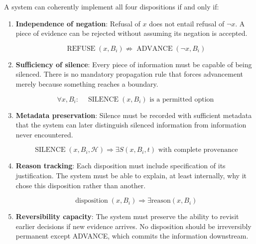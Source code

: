 \documentclass[12pt]{article}
\begin{document}
\begin{theorem}
A system can coherently implement all four dispositions if and only if:

\begin{enumerate}

\item \textbf{Independence of negation}: Refusal of $x$ does not entail refusal of $\neg x$. A piece of evidence can be rejected without assuming its negation is accepted.

\begin{equation}
\operatorname{REFUSE}(x, B_i) \not\Rightarrow \operatorname{ADVANCE}(\neg x, B_i)
\end{equation}

\item \textbf{Sufficiency of silence}: Every piece of information must be capable of being silenced. There is no mandatory propagation rule that forces advancement merely because something reaches a boundary.

\begin{equation}
\forall x, B_i: \quad \operatorname{SILENCE}(x, B_i) \text{ is a permitted option}
\end{equation}

\item \textbf{Metadata preservation}: Silence must be recorded with sufficient metadata that the system can later distinguish silenced information from information never encountered.

\begin{equation}
\operatorname{SILENCE}(x, B_i, \mathcal{H}) \Rightarrow \exists S(x, B_i, t) \text{ with complete provenance}
\end{equation}

\item \textbf{Reason tracking}: Each disposition must include specification of its justification. The system must be able to explain, at least internally, why it chose this disposition rather than another.

\begin{equation}
\operatorname{disposition}(x, B_i) \Rightarrow \exists \text{reason}(x, B_i)
\end{equation}

\item \textbf{Reversibility capacity}: The system must preserve the ability to revisit earlier decisions if new evidence arrives. No disposition should be irreversibly permanent except ADVANCE, which commits the information downstream.


\end{enumerate}
\end{theorem}
\end{document}
